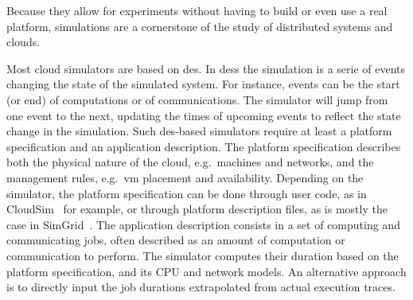 \documentclass[10pt,conference,compsocconf]{IEEEtran}
\begin{document}
Because they allow for experiments without having to build or even use a real 
platform, simulations are a cornerstone of the study of distributed
systems and clouds.  

Most cloud simulators  are based on \ac{des}. In \aclp{des}  the simulation is a
serie  of events  changing the  state of  the simulated  system.  For  instance,
events can  be the  start (or  end) of computations  or of  communications.  The
simulator will jump from  one event to the next, updating  the times of upcoming
events  to reflect  the state  change  in the  simulation.  Such  \ac{des}-based
simulators  require  at  least  a  platform  specification  and  an  application
description.  The platform  specification describes both the  physical nature of
the cloud,  e.g.~machines and networks,  and the management  rules, e.g.~\ac{vm}
placement  and   availability.   Depending   on  the  simulator,   the  platform
specification can be done through  user code, as in CloudSim~\cite{cloudsim} for
example,  or through  platform  description  files, as  is  mostly  the case  in
SimGrid~\cite{simgrid}.   The  application  description  consists in  a  set  of
computing and communicating  jobs, often described as an  amount of computation
or communication to perform. The simulator  computes their duration based on the
platform specification, and its CPU and network models.  An alternative approach
is  to directly  input the  job  durations extrapolated  from actual  execution
traces.
\end{document}
